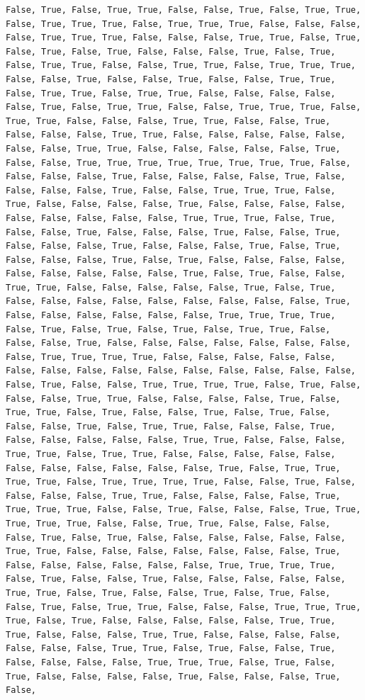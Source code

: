\documentclass[
  letterpaper,
  DIV=11,
  numbers=noendperiod]{scrartcl}
\begin{document}
\begin{verbatim}
False, True, False, True, True, False, False, True, False, True, True, False, True, True, True, False, True, True, True, False, False, False, False, True, True, True, False, False, False, True, True, False, True, False, True, False, True, False, False, False, True, False, True, False, True, True, False, False, True, True, False, True, True, True, False, False, True, False, False, True, False, False, True, True, False, True, True, False, True, True, False, False, False, False, False, True, False, True, True, False, False, True, True, True, False, True, True, False, False, False, True, True, False, False, True, False, False, False, True, True, False, False, False, False, False, False, False, True, True, False, False, False, False, False, True, False, False, True, True, True, True, True, True, True, True, False, False, False, False, True, False, False, False, False, True, False, False, False, False, True, False, False, True, True, True, False, True, False, False, False, False, True, False, False, False, False, False, False, False, False, False, True, True, True, False, True, False, False, True, False, False, False, True, False, False, True, False, False, False, True, False, False, False, True, False, True, False, False, False, True, False, True, False, False, False, False, False, False, False, False, False, True, False, True, False, False, True, True, False, False, False, False, False, True, False, True, False, False, False, False, False, False, False, False, False, True, False, False, False, False, False, False, True, True, True, True, False, True, False, True, False, True, False, True, True, False, False, False, True, False, False, False, False, False, False, False, False, True, True, True, True, False, False, False, False, False, False, False, False, False, False, False, False, False, False, False, False, True, False, False, True, True, True, True, False, True, False, False, False, True, True, False, False, False, False, True, False, True, True, False, True, False, False, True, False, True, False, False, False, True, False, True, True, False, False, False, True, False, False, False, False, False, True, True, False, False, False, True, True, False, True, True, False, False, False, False, False, False, False, False, False, False, False, True, False, True, True, True, True, False, True, True, True, True, False, False, True, False, False, False, False, True, True, False, False, False, False, True, True, True, True, False, False, True, False, False, False, True, True, True, True, True, False, False, True, True, False, False, False, False, True, False, True, False, False, False, False, False, False, True, True, False, False, False, False, False, False, False, True, False, False, False, False, False, False, True, True, True, True, False, True, False, False, True, False, False, False, False, False, True, True, False, True, False, False, True, False, True, False, False, True, False, True, True, False, False, False, True, True, True, True, False, True, False, False, False, False, False, True, True, True, False, False, False, True, True, False, False, False, False, False, False, False, True, True, False, True, False, False, True, False, False, False, False, True, True, True, False, True, False, True, False, False, False, False, True, False, False, False, True, False, 
\end{verbatim}
\end{document}
